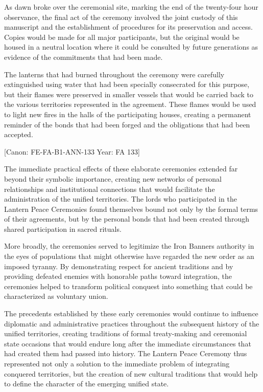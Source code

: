 As dawn broke over the ceremonial site, marking the end of the
twenty-four hour observance, the final act of the ceremony involved the
joint custody of this manuscript and the establishment of procedures for
its preservation and access. Copies would be made for all major
participants, but the original would be housed in a neutral location
where it could be consulted by future generations as evidence of the
commitments that had been made.

The lanterns that had burned throughout the ceremony were carefully
extinguished using water that had been specially consecrated for this
purpose, but their flames were preserved in smaller vessels that would
be carried back to the various territories represented in the agreement.
These flames would be used to light new fires in the halls of the
participating houses, creating a permanent reminder of the bonds that
had been forged and the obligations that had been accepted.

{[}Canon: FE-FA-B1-ANN-133 \textbar{} Year: FA 133{]}

The immediate practical effects of these elaborate ceremonies extended
far beyond their symbolic importance, creating new networks of personal
relationships and institutional connections that would facilitate the
administration of the unified territories. The lords who participated in
the Lantern Peace Ceremonies found themselves bound not only by the
formal terms of their agreements, but by the personal bonds that had
been created through shared participation in sacred rituals.

More broadly, the ceremonies served to legitimize the Iron
Banner\textquotesingle s authority in the eyes of populations that might
otherwise have regarded the new order as an imposed tyranny. By
demonstrating respect for ancient traditions and by providing defeated
enemies with honorable paths toward integration, the ceremonies helped
to transform political conquest into something that could be
characterized as voluntary union.

The precedents established by these early ceremonies would continue to
influence diplomatic and administrative practices throughout the
subsequent history of the unified territories, creating traditions of
formal treaty-making and ceremonial state occasions that would endure
long after the immediate circumstances that had created them had passed
into history. The Lantern Peace Ceremony thus represented not only a
solution to the immediate problem of integrating conquered territories,
but the creation of new cultural traditions that would help to define
the character of the emerging unified state.


